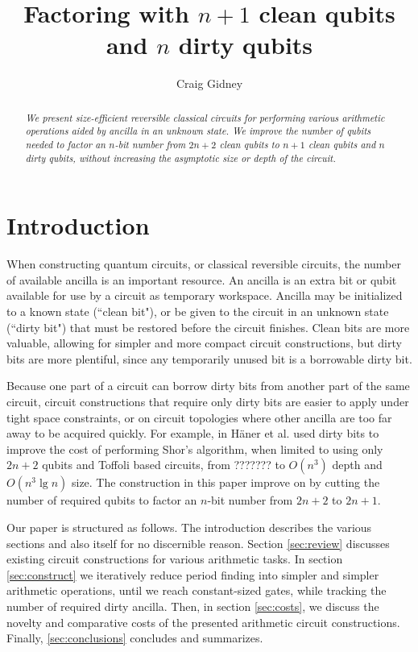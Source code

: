 \documentclass[twocolumn]{article}
\title{Factoring with $n+1$ clean qubits and $n$ dirty qubits}
\author{Craig Gidney}
\begin{document}
\maketitle

\begin{abstract}
\em
We present size-efficient reversible classical circuits for performing various arithmetic operations aided by ancilla in an unknown state.
We improve the number of qubits needed to factor an $n$-bit number from $2n+2$ clean qubits \cite{takahashi2006, haner2016} to $n+1$ clean qubits and $n$ dirty qubits, without increasing the asymptotic size or depth of the circuit.
\end{abstract}

\section{Introduction}

When constructing quantum circuits, or classical reversible circuits, the number of available ancilla is an important resource.
An ancilla is an extra bit or qubit available for use by a circuit as temporary workspace.
Ancilla may be initialized to a known state (``clean bit"), or be given to the circuit in an unknown state (``dirty bit") that must be restored before the circuit finishes.
Clean bits are more valuable, allowing for simpler and more compact circuit constructions, but dirty bits are more plentiful, since any temporarily unused bit is a borrowable dirty bit.

Because one part of a circuit can borrow dirty bits from another part of the same circuit, circuit constructions that require only dirty bits are easier to apply under tight space constraints, or on circuit topologies where other ancilla are too far away to be acquired quickly.
For example, in \cite{haner2016} H\"{a}ner et al. used dirty bits to improve the cost of performing Shor's algorithm, when limited to using only $2n+2$ qubits and Toffoli based circuits, from ??????? to $O(n^3)$ depth and $O(n^3 \lg n)$ size.
The construction in this paper improve on \cite{haner2016} by cutting the number of required qubits to factor an $n$-bit number from $2n+2$ to $2n+1$.

Our paper is structured as follows.
The introduction describes the various sections and also itself for no discernible reason.
Section \ref{sec:review} discusses existing circuit constructions for various arithmetic tasks.
In section \ref{sec:construct} we iteratively reduce period finding into simpler and simpler arithmetic operations, until we reach constant-sized gates, while tracking the number of required dirty ancilla.
Then, in section \ref{sec:costs}, we discuss the novelty and comparative costs of the presented arithmetic circuit constructions.
Finally, \ref{sec:conclusions} concludes and summarizes.
\end{document}
